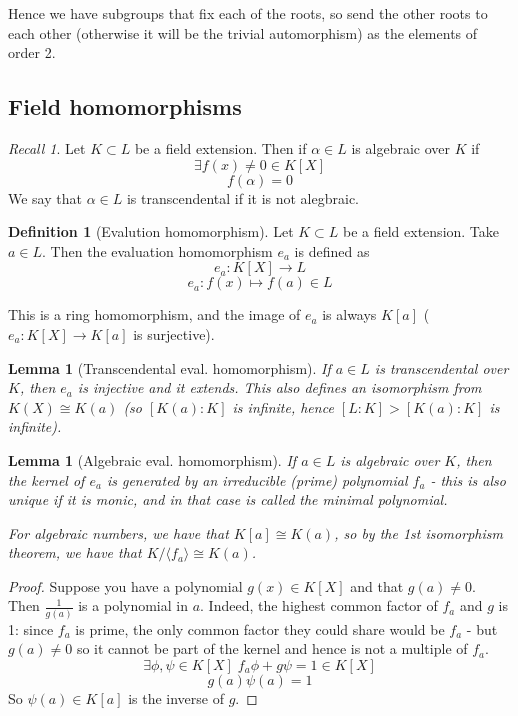 \documentclass{article}
\theoremstyle{definition}
\newtheorem{defn}{Definition}[section]
\theoremstyle{plain}%
\newtheorem{lem}[thm]{Lemma}
\theoremstyle{remark}
\newtheorem*{rec}{Recall}
\begin{document}
Hence we have subgroups that fix each of the roots, so send the other roots to each other (otherwise it will be the trivial automorphism) as the elements of order 2.

\subsection{Field homomorphisms}

\begin{rec}
Let $K \subset L$ be a field extension. Then if $\alpha \in L$ is algebraic over $K$ if \[\exists f(x) \ne 0 \in K[X]\] \[f(\alpha) = 0\] We say that $\alpha \in L$ is transcendental if it is not alegbraic.
\end{rec}

\begin{defn}[Evalution homomorphism]
Let $K \subset L$ be a field extension. Take $a \in L$. Then the evaluation homomorphism $e_a$ is defined as \[e_a : K[X] \to L \] \[e_a: f(x) \mapsto f(a) \in L\]

This is a ring homomorphism, and the image of $e_a$ is always $K[a]$ ($e_a : K[X] \to K[a]$ is surjective).
\end{defn}

\begin{lem}[Transcendental eval. homomorphism]
If $a \in L$ is transcendental over $K$, then $e_a$ is injective and it extends. This also defines an isomorphism from $K(X) \cong K(a)$ (so $[K(a) : K]$ is infinite, hence $[L : K] > [K(a) : K]$ is infinite).
\end{lem}

\begin{lem}[Algebraic eval. homomorphism]\label{Eval lemma 2}
If $a \in L$ is algebraic over $K$, then the kernel of $e_a$ is generated by an irreducible (prime) polynomial $f_a$ - this is also unique if it is monic, and in that case is called the minimal polynomial.

For algebraic numbers, we have that $K[a] \cong K(a)$, so by the 1st isomorphism theorem, we have that $K/\langle f_a\rangle \cong K(a)$.
\end{lem}

\begin{proof}
Suppose you have a polynomial $g(x) \in K[X]$ and that $g(a) \ne 0$. Then $\frac{1}{g(a)}$ is a polynomial in $a$. Indeed, the highest common factor of $f_a$ and $g$ is 1: since $f_a$ is prime, the only common factor they could share would be $f_a$ - but $g(a) \ne 0$ so it cannot be part of the kernel and hence is not a multiple of $f_a$.
\[\exists \phi, \psi \in K[X] \; f_a\phi + g\psi = 1 \in K[X]\]
\[g(a)\psi(a) = 1\]
So $\psi(a) \in K[a]$ is the inverse of $g$.
\end{proof}
\end{document}
